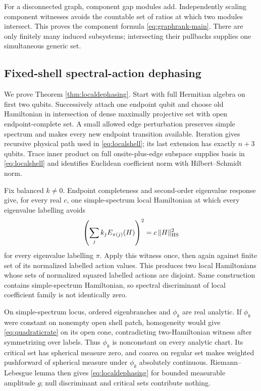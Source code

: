 For a disconnected graph, component gap modules add.  Independently scaling
component witnesses avoids the countable set of ratios at which two modules
intersect.  This proves the component formula
\eqref{eq:graphrank-main}.  There are only finitely many induced subsystems;
intersecting their pullbacks supplies one simultaneous generic set.

\subsection{Fixed-shell spectral-action dephasing}

We prove Theorem \ref{thm:localdephasing}.  Start with full Hermitian algebra
on first two qubits.  Successively attach one endpoint qubit and choose old
Hamiltonian in intersection of dense maximally projective set with open
endpoint-complete set.  A small allowed edge perturbation preserves simple
spectrum and makes every new endpoint transition available.  Iteration gives
recursive physical path used in \eqref{eq:localshell}; its last extension has
exactly $n+3$ qubits.  Trace inner product on full onsite-plus-edge subspace
supplies basis in \eqref{eq:localshell} and identifies Euclidean coefficient
norm with Hilbert--Schmidt norm.

Fix balanced $k\ne0$.  Endpoint completeness and second-order eigenvalue
response give, for every real $c$, one simple-spectrum local Hamiltonian at
which every eigenvalue labelling avoids
\begin{equation}
 \left(\sum_j k_jE_{\pi(j)}(H)\right)^2
   =c\,\|H\|_{\rm HS}^2                              \label{eq:quadraticrate}
\end{equation}
for every eigenvalue labelling $\pi$.  Apply this witness once, then again
against finite set of its normalized labelled action values.  This produces
two local Hamiltonians whose sets
of normalized squared labelled actions are disjoint.  Same construction
contains simple-spectrum Hamiltonian, so spectral discriminant of local
coefficient family is not identically zero.

On simple-spectrum locus, ordered eigenbranches and $\phi_k$ are real
analytic.  If $\phi_k$ were constant on nonempty open shell patch,
homogeneity would give \eqref{eq:quadraticrate} on its open cone, contradicting
two-Hamiltonian witness after symmetrizing over labels.  Thus $\phi_k$ is
nonconstant on every analytic chart.  Its critical set has spherical measure
zero, and coarea on regular set makes weighted pushforward of spherical
measure under $\phi_k$ absolutely continuous.  Riemann--Lebesgue lemma then
gives \eqref{eq:localdephasing} for bounded measurable amplitude $g$; null
discriminant and critical sets contribute nothing.

